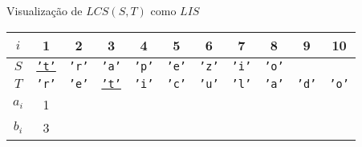 \begin{frame}[fragile]{Visualização de $LCS(S, T)$ como $LIS$}

    \begin{table}
        \centering

        \begin{tabular}{c|cccccccccc} 
        \hline 
        $i$ & 1 & 2 & 3 & 4 & 5 & 6 & 7 & 8 & 9 & 10\\
        \hline
        $S$
        & \underline{\textcolor{blue!80!black}{\texttt{'t'}}}
        & \textcolor{blue!80!black}{\texttt{'r'}}
        & \textcolor{blue!80!black}{\texttt{'a'}}
        & \textcolor{blue!80!black}{\texttt{'p'}}
        & \textcolor{blue!80!black}{\texttt{'e'}}
        & \textcolor{blue!80!black}{\texttt{'z'}}
        & \textcolor{blue!80!black}{\texttt{'i'}}
        & \textcolor{blue!80!black}{\texttt{'o'}} \\
        $T$
        & \textcolor{green!50!black}{\texttt{'r'}}
        & \textcolor{green!50!black}{\texttt{'e'}}
        & \underline{\textcolor{green!50!black}{\texttt{'t'}}}
        & \textcolor{green!50!black}{\texttt{'i'}}
        & \textcolor{green!50!black}{\texttt{'c'}}
        & \textcolor{green!50!black}{\texttt{'u'}}
        & \textcolor{green!50!black}{\texttt{'l'}}
        & \textcolor{green!50!black}{\texttt{'a'}}
        & \textcolor{green!50!black}{\texttt{'d'}}
        & \textcolor{green!50!black}{\texttt{'o'}} \\
        $a_i$ & 1\\
        $b_i$ & 3\\
        \hline
        \end{tabular}

    \end{table}

\end{frame}

